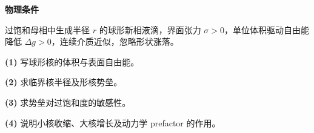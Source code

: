 \textbf{物理条件}\par 过饱和母相中生成半径 \(r\) 的球形新相液滴，界面张力 \(\sigma>0\)，单位体积驱动自由能降低 \(\Delta g>0\)，连续介质近似，忽略形状涨落。
\par\noindent\textbf{(1)} 写球形核的体积与表面自由能。
\par\noindent\textbf{(2)} 求临界核半径及形核势垒。
\par\noindent\textbf{(3)} 求势垒对过饱和度的敏感性。
\par\noindent\textbf{(4)} 说明小核收缩、大核增长及动力学 prefactor 的作用。
